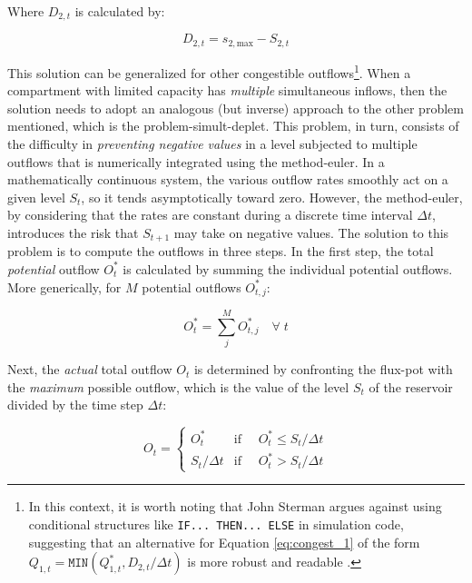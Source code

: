 \documentclass[./main_en.tex]{subfiles}
\begin{document}
Where $D_{2,t}$ is calculated by:
\begin{linenomath*}
\begin{equation} 
	\label{eq:congest_2}
 D_{2,t} = s_{2, \text{max}} - S_{2,t}
\end{equation}
\end{linenomath*}
\par This solution can be generalized for other congestible outflows\footnote{In this context, it is worth noting that John Sterman argues against using conditional structures like \texttt{IF... THEN... ELSE} in simulation code, suggesting that an alternative for Equation \eqref{eq:congest_1} of the form $Q_{1,t} = \texttt{MIN}(Q^*_{1,t}, D_{2, t} / \Delta t)$ is more robust and readable \cite{sterman2000}.}. When a compartment with limited capacity has \textit{multiple} simultaneous inflows, then the solution needs to adopt an analogous (but inverse) approach to the other problem mentioned, which is the \gls{problem-simult-deplet}. This problem, in turn, consists of the difficulty in \textit{preventing negative values} in a level subjected to multiple outflows that is numerically integrated using the \gls{method-euler}. In a mathematically continuous \gls{system}, the various outflow rates smoothly act on a given level $S_t$, so it tends asymptotically toward zero. However, the \gls{method-euler}, by considering that the rates are constant during a discrete time interval $\Delta t$, introduces the risk that $S_{t+1}$ may take on negative values. The solution to this problem is to compute the outflows in three steps. In the first step, the total \textit{potential} outflow $O^*_t$ is calculated by summing the individual potential outflows. More generically, for $M$ potential outflows $O^*_{t,j}$:
\begin{linenomath*}
\begin{equation} 
\label{eq:simult_1}
 O^*_t = \sum_{j}^{M}O^*_{t, j} \quad \forall\;t
\end{equation}
\end{linenomath*}
Next, the \textit{actual} total outflow $O_t$ is determined by confronting the \gls{flux-pot} with the \textit{maximum} possible outflow, which is the value of the level $S_t$ of the reservoir divided by the time step $\Delta t$:
\begin{linenomath*}
\begin{equation} 
	\label{eq:simult_2}
 O_{t} = 
\begin{cases} 
    O^*_t & \text{if } \quad O^*_t \leq S_t / \Delta t\\
    S_t / \Delta t & \text{if } \quad O^*_t > S_t / \Delta t
\end{cases}
\end{equation}
\end{linenomath*}
\end{document}

